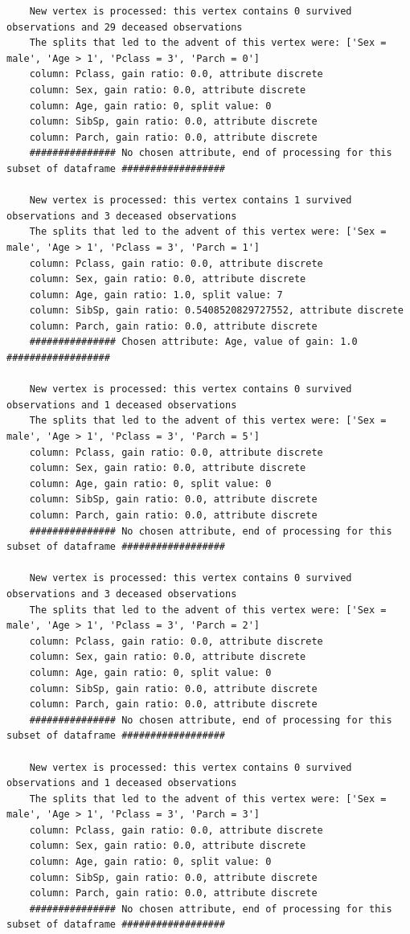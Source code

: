 \documentclass[12pt]{article}
\begin{document}
\begin{verbatim}
	New vertex is processed: this vertex contains 0 survived observations and 29 deceased observations
	The splits that led to the advent of this vertex were: ['Sex = male', 'Age > 1', 'Pclass = 3', 'Parch = 0']
	column: Pclass, gain ratio: 0.0, attribute discrete
	column: Sex, gain ratio: 0.0, attribute discrete
	column: Age, gain ratio: 0, split value: 0
	column: SibSp, gain ratio: 0.0, attribute discrete
	column: Parch, gain ratio: 0.0, attribute discrete
	############### No chosen attribute, end of processing for this subset of dataframe ##################
	
	New vertex is processed: this vertex contains 1 survived observations and 3 deceased observations
	The splits that led to the advent of this vertex were: ['Sex = male', 'Age > 1', 'Pclass = 3', 'Parch = 1']
	column: Pclass, gain ratio: 0.0, attribute discrete
	column: Sex, gain ratio: 0.0, attribute discrete
	column: Age, gain ratio: 1.0, split value: 7
	column: SibSp, gain ratio: 0.5408520829727552, attribute discrete
	column: Parch, gain ratio: 0.0, attribute discrete
	############### Chosen attribute: Age, value of gain: 1.0 ##################
	
	New vertex is processed: this vertex contains 0 survived observations and 1 deceased observations
	The splits that led to the advent of this vertex were: ['Sex = male', 'Age > 1', 'Pclass = 3', 'Parch = 5']
	column: Pclass, gain ratio: 0.0, attribute discrete
	column: Sex, gain ratio: 0.0, attribute discrete
	column: Age, gain ratio: 0, split value: 0
	column: SibSp, gain ratio: 0.0, attribute discrete
	column: Parch, gain ratio: 0.0, attribute discrete
	############### No chosen attribute, end of processing for this subset of dataframe ##################
	
	New vertex is processed: this vertex contains 0 survived observations and 3 deceased observations
	The splits that led to the advent of this vertex were: ['Sex = male', 'Age > 1', 'Pclass = 3', 'Parch = 2']
	column: Pclass, gain ratio: 0.0, attribute discrete
	column: Sex, gain ratio: 0.0, attribute discrete
	column: Age, gain ratio: 0, split value: 0
	column: SibSp, gain ratio: 0.0, attribute discrete
	column: Parch, gain ratio: 0.0, attribute discrete
	############### No chosen attribute, end of processing for this subset of dataframe ##################
	
	New vertex is processed: this vertex contains 0 survived observations and 1 deceased observations
	The splits that led to the advent of this vertex were: ['Sex = male', 'Age > 1', 'Pclass = 3', 'Parch = 3']
	column: Pclass, gain ratio: 0.0, attribute discrete
	column: Sex, gain ratio: 0.0, attribute discrete
	column: Age, gain ratio: 0, split value: 0
	column: SibSp, gain ratio: 0.0, attribute discrete
	column: Parch, gain ratio: 0.0, attribute discrete
	############### No chosen attribute, end of processing for this subset of dataframe ##################
	

\end{verbatim}
\end{document}
